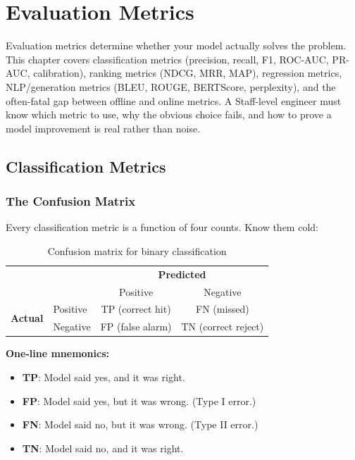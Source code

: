\chapter{Evaluation Metrics}
\label{chap:evaluation_metrics}

\begin{tldr}
Evaluation metrics determine whether your model actually solves the problem. This chapter covers classification metrics (precision, recall, F1, ROC-AUC, PR-AUC, calibration), ranking metrics (NDCG, MRR, MAP), regression metrics, NLP/generation metrics (BLEU, ROUGE, BERTScore, perplexity), and the often-fatal gap between offline and online metrics. A Staff-level engineer must know which metric to use, why the obvious choice fails, and how to prove a model improvement is real rather than noise.
\end{tldr}

\section{Classification Metrics}
\label{sec:classification_metrics}

\subsection{The Confusion Matrix}

Every classification metric is a function of four counts. Know them cold:

\begin{table}[H]
\centering
\caption{Confusion matrix for binary classification}
\begin{tabular}{ll|cc}
\toprule
& & \multicolumn{2}{c}{\textbf{Predicted}} \\
& & Positive & Negative \\
\midrule
\multirow{2}{*}{\textbf{Actual}} & Positive & TP (correct hit) & FN (missed) \\
& Negative & FP (false alarm) & TN (correct reject) \\
\bottomrule
\end{tabular}
\end{table}

\textbf{One-line mnemonics:}
\begin{itemize}
    \item \textbf{TP}: Model said yes, and it was right.
    \item \textbf{FP}: Model said yes, but it was wrong. (Type I error.)
    \item \textbf{FN}: Model said no, but it was wrong. (Type II error.)
    \item \textbf{TN}: Model said no, and it was right.
\end{itemize}

